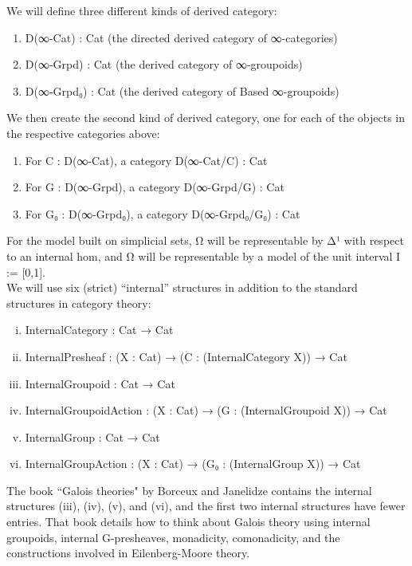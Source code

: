 \documentclass{book}
\theoremstyle{definition}
\begin{document}
We will define three different kinds of derived category:\\

\begin{enumerate}
\item D(∞-Cat) : Cat (the directed derived category of ∞-categories)
\item D(∞-Grpd) : Cat (the derived category of ∞-groupoids)
\item D(∞-Grpd₀) : Cat (the derived category of Based ∞-groupoids)
\end{enumerate}

We then create the second kind of derived category, one for each of the objects in the respective categories above:

\begin{enumerate}
\item For C : D(∞-Cat), a category D(∞-Cat/C) : Cat
\item For G : D(∞-Grpd), a category D(∞-Grpd/G) : Cat
\item For G₀ : D(∞-Grpd₀), a category D(∞-Grpd₀/G₀) : Cat
\end{enumerate}

For the model built on simplicial sets, Ω⃗ will be representable by Δ¹ with respect to an internal hom, and Ω⃡ will be representable by a model of the unit interval I := [0,1].\\

We will use six (strict) ``internal'' structures in addition to the standard structures in category theory:

\begin{enumerate}[(i)]
\item InternalCategory : Cat → Cat 
\item InternalPresheaf : (X : Cat) → (C : (InternalCategory X)) → Cat
\item InternalGroupoid : Cat → Cat
\item InternalGroupoidAction : (X : Cat) → (G : (InternalGroupoid X)) → Cat
\item InternalGroup : Cat → Cat
\item InternalGroupAction : (X : Cat) → (G₀ : (InternalGroup X)) → Cat   
\end{enumerate}

The book ``Galois theories" by Borceux and Janelidze contains the internal structures (iii), (iv), (v), and (vi), and the first two internal structures have fewer entries. That book details how to think about Galois theory using internal groupoids, internal G-presheaves, monadicity, comonadicity, and the constructions involved in Eilenberg-Moore theory.\\
\end{document}
